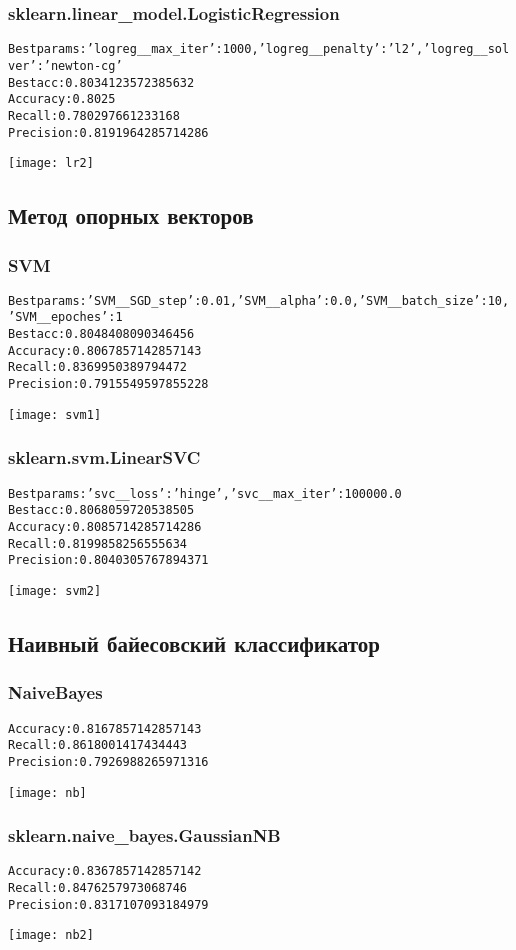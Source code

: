 \subsubsection{sklearn.linear\_model.LogisticRegression}
\begin{alltt}
Best params: {'logreg__max_iter': 1000, 'logreg__penalty': 'l2', 'logreg__solver': 'newton-cg'}
Best acc: 0.8034123572385632
Accuracy: 0.8025
Recall: 0.780297661233168
Precision: 0.8191964285714286
\end{alltt}
\begin{center}
\texttt{[image: lr2]}
\end{center}
\pagebreak

\subsection{Метод опорных векторов}
\subsubsection{SVM}
\begin{alltt}
Best params: {'SVM__SGD_step': 0.01, 'SVM__alpha': 0.0, 'SVM__batch_size': 10, 'SVM__epoches': 1}
Best acc: 0.8048408090346456
Accuracy: 0.8067857142857143
Recall: 0.8369950389794472
Precision: 0.7915549597855228
\end{alltt}
\begin{center}
\texttt{[image: svm1]}
\end{center}

\subsubsection{sklearn.svm.LinearSVC}
\begin{alltt}
Best params: {'svc__loss': 'hinge', 'svc__max_iter': 100000.0}
Best acc: 0.8068059720538505
Accuracy: 0.8085714285714286
Recall: 0.8199858256555634
Precision: 0.8040305767894371
\end{alltt}
\begin{center}
\texttt{[image: svm2]}
\end{center}
\pagebreak

\subsection{Наивный байесовский классификатор}
\subsubsection{NaiveBayes}
\begin{alltt}
Accuracy: 0.8167857142857143
Recall: 0.8618001417434443
Precision: 0.7926988265971316
\end{alltt}
\begin{center}
\texttt{[image: nb]}
\end{center}

\subsubsection{sklearn.naive\_bayes.GaussianNB}
\begin{alltt}
Accuracy: 0.8367857142857142
Recall: 0.8476257973068746
Precision: 0.8317107093184979
\end{alltt}
\begin{center}
\texttt{[image: nb2]}
\end{center}
\pagebreak
